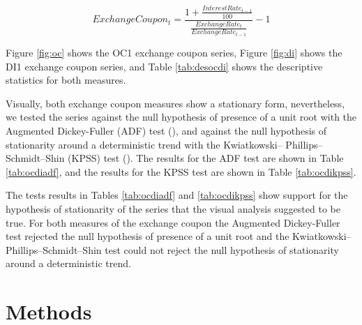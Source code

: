 \documentclass[cic,tc, english]{iiufrgs}
\begin{document}
    \begin{equation}
        \label{eqn:coupon}
        ExchangeCoupon_t = \frac{1 + \frac{InterestRate_{t-1}}{100}}{\frac{ExchangeRate_t}{ExchangeRate_{t-1}}} - 1
    \end{equation}

    Figure \ref{fig:oc} shows the OC1 exchange coupon series, Figure \ref{fig:di} shows the DI1 exchange coupon series, and Table \ref{tab:desocdi} shows the descriptive statistics for both measures.

    

    

    

    Visually, both exchange coupon measures show a stationary form, nevertheless, we tested the series against the null hypothesis of presence of a unit root with the Augmented Dickey-Fuller (ADF) test (\citet{adf}), and against the null hypothesis of stationarity around a deterministic trend with the Kwiatkowski– Phillips–Schmidt–Shin (KPSS) test (\citet{kpss}). The results for the ADF test are shown in Table \ref{tab:ocdiadf}, and the results for the KPSS test are shown in Table \ref{tab:ocdikpss}.

    

    

    The tests results in Tables \ref{tab:ocdiadf} and \ref{tab:ocdikpss} show support for the hypothesis of stationarity of the series that the visual analysis suggested to be true. For both measures of the exchange coupon the Augmented Dickey-Fuller test rejected the null hypothesis of presence of a unit root and the Kwiatkowski– Phillips–Schmidt–Shin test could not reject the null hypothesis of stationarity around a deterministic trend.
    
    \begin{comment}
        On ten of October 2015 a impeachment request for president Dilma Rousseff was handed to the Chamber Of Representatives' president, who accepted the request on December second. The opening of the impeachment process was accepted by the special impeachment committee on eleven of April 2016.
    \end{comment}

\section{Methods} \label{chapter_methods}
\end{document}
